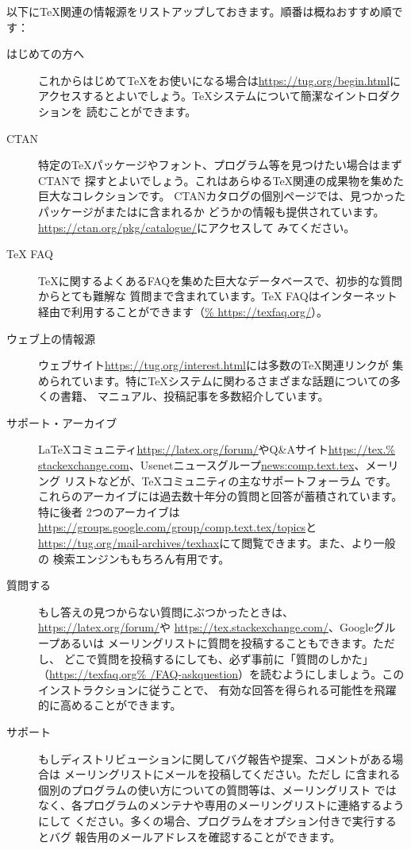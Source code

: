 \documentclass[uplatex,dvipdfmx,12pt,tombow]{jsarticle}
\begin{document}
以下に\TeX 関連の情報源をリストアップしておきます。順番は概ねおすすめ順です：
%
\begin{description}
\item[はじめての方へ]
これからはじめて\TeX をお使いになる場合は\url{https://tug.org/begin.html}に
アクセスするとよいでしょう。\TeX システムについて簡潔なイントロダクションを
読むことができます。

\item[CTAN]
特定の\TeX パッケージやフォント、プログラム等を見つけたい場合はまずCTANで
探すとよいでしょう。これはあらゆる\TeX 関連の成果物を集めた巨大なコレクションです。
CTANカタログの個別ページでは、見つかったパッケージが\TL または\MIKTEX に含まれるか
どうかの情報も提供されています。\url{https://ctan.org/pkg/catalogue/}にアクセスして
みてください。

\item[{\TeX} FAQ]
\TeX に関するよくあるFAQを集めた巨大なデータベースで、初歩的な質問からとても難解な
質問まで含まれています。{\TeX} FAQはインターネット経由で利用することができます（\url{%
https://texfaq.org/}）。

\item[ウェブ上の情報源]
ウェブサイト\url{https://tug.org/interest.html}には多数の\TeX 関連リンクが
集められています。特に\TeX システムに関わるさまざまな話題についての多くの書籍、
マニュアル、投稿記事を多数紹介しています。

\item[サポート・アーカイブ]
\LaTeX コミュニティ\url{https://latex.org/forum/}やQ\&Aサイト\url{https://tex.%
stackexchange.com}、Usenetニュースグループ\url{news:comp.text.tex}、メーリング
リストなどが、\TeX コミュニティの主なサポートフォーラム
です。これらのアーカイブには過去数十年分の質問と回答が蓄積されています。特に後者
2つのアーカイブは\url{https://groups.google.com/group/comp.text.tex/topics}と
\url{https://tug.org/mail-archives/texhax}にて閲覧できます。また、より一般の
検索エンジンももちろん有用です。

\item[質問する]
もし答えの見つからない質問にぶつかったときは、\url{https://latex.org/forum/}や
\url{https://tex.stackexchange.com/}、Googleグループあるいは
メーリングリストに質問を投稿することもできます。ただし、
どこで質問を投稿するにしても、必ず事前に「質問のしかた」（\url{https://texfaq.org%
/FAQ-askquestion}）を読むようにしましょう。このインストラクションに従うことで、
有効な回答を得られる可能性を飛躍的に高めることができます。

\item[\TL サポート]
もし\TL ディストリビューションに関してバグ報告や提案、コメントがある場合は
\TL メーリングリストにメールを投稿してください。ただし
\TL に含まれる個別のプログラムの使い方についての質問等は、\TL メーリングリスト
ではなく、各プログラムのメンテナや専用のメーリングリストに連絡するようにして
ください。多くの場合、プログラムをオプション付きで実行するとバグ
報告用のメールアドレスを確認することができます。
\end{description}
\end{document}

